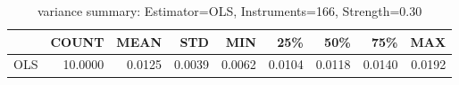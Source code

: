 \begin{table}[ht]
\centering
\caption{variance summary: Estimator=OLS, Instruments=166, Strength=0.30}
\begin{tabular}{lrrrrrrrr}
\toprule
 & COUNT & MEAN & STD & MIN & 25\% & 50\% & 75\% & MAX \\
\midrule
OLS & 10.0000 & 0.0125 & 0.0039 & 0.0062 & 0.0104 & 0.0118 & 0.0140 & 0.0192 \\
\bottomrule
\end{tabular}
\end{table}
